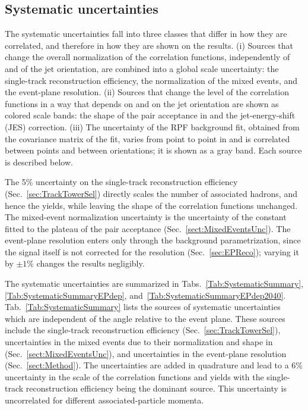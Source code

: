 \subsection{Systematic uncertainties} \label{sect:SysUnc}
The systematic uncertainties fall into three classes that differ in how they are correlated, and therefore in how they are shown on the results.
%
(i) Sources that change the overall normalization of the correlation functions, independently of \dphi and of the jet orientation, are combined into a global scale uncertainty: the single-track reconstruction efficiency, the normalization of the mixed events, and the event-plane resolution.
%
(ii) Sources that change the level of the correlation functions in a way that depends on  and on the jet orientation are shown as colored scale bands: the shape of the pair acceptance in \deta and the jet-energy-shift (JES) correction.
%
(iii) The uncertainty of the RPF background fit, obtained from the covariance matrix of the fit, varies from point to point in \dphi and is correlated between points and between orientations; it is shown as a gray band.
%
Each source is described below.

The 5\% uncertainty on the single-track reconstruction efficiency (Sec.~\ref{sec:TrackTowerSel}) directly scales the number of associated hadrons, and hence the yields, while leaving the shape of the correlation functions unchanged.
%
The mixed-event normalization uncertainty is the uncertainty of the constant fitted to the plateau of the pair acceptance (Sec.~\ref{sect:MixedEventsUnc}).
%
The event-plane resolution enters only through the background parametrization, since the signal itself is not corrected for the resolution (Sec.~\ref{sec:EPReco}); varying it by $\pm 1\%$ changes the results negligibly.

The systematic uncertainties are summarized in Tabs.~\ref{Tab:SystematicSummary}, \ref{Tab:SystematicSummaryEPdep}, and~\ref{Tab:SystematicSummaryEPdep2040}.  Tab.~\ref{Tab:SystematicSummary} lists the sources of systematic uncertainties which are independent of the angle relative to the event plane.  These sources include the single-track reconstruction efficiency (Sec.~\ref{sec:TrackTowerSel}), 
uncertainties in the mixed events due to their normalization and shape in \dphi (Sec.~\ref{sect:MixedEventsUnc}), and uncertainties in the event-plane resolution (Sec.~\ref{sect:Method}).  The uncertainties are added in quadrature and lead to a 6\% uncertainty in the scale of the correlation functions and yields with the single-track reconstruction efficiency being the dominant source.  This uncertainty is uncorrelated for different associated-particle momenta.

